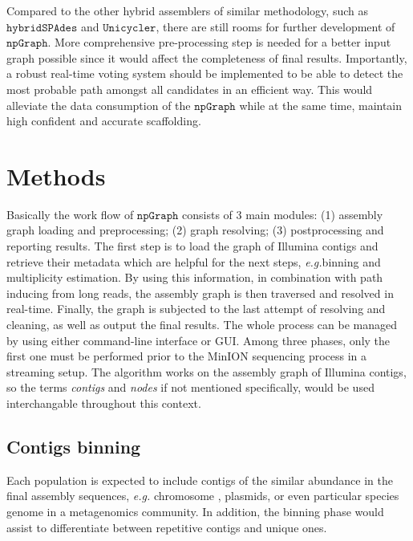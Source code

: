 \documentclass[10pt,twocolumn,twoside]{genpaper}
\newcommand{\npgraph}{$\mathtt{npGraph}$}
\newcommand{\unicycler}{$\mathtt{Unicycler}$}
\newcommand{\EG}{\emph{e.g.}}
\begin{document}
Compared to the other hybrid assemblers of similar methodology, such as $\mathtt{hybridSPAdes}$ and \unicycler{}, there are still rooms for further development of \npgraph{}. 
More comprehensive pre-processing step is needed for a better input graph possible since it would affect the completeness of final results. 
Importantly, a robust real-time voting system should be implemented to be able to detect the most probable path amongst all candidates in an efficient way.
This would alleviate the data consumption of the \npgraph{} while at the same time, maintain high confident and accurate scaffolding. 


\section*{Methods}

Basically the work flow of \npgraph{} consists of 3 main modules: (1) assembly graph loading and preprocessing; (2) graph resolving; (3) postprocessing and reporting results. 
The first step is to load the graph of Illumina contigs and retrieve their metadata which are helpful for the next steps, \EG binning and multiplicity estimation.
By using this information, in combination with path inducing from long reads, the assembly graph is then traversed and resolved in real-time.
Finally, the graph is subjected to the last attempt of resolving and cleaning, as well as output the final results. The whole process can be managed by using either command-line interface or GUI.
Among three phases, only the first one must be performed prior to the MinION sequencing process in a streaming setup.
The algorithm works on the assembly graph of Illumina contigs, so the terms \emph{contigs} and \emph{nodes} if not mentioned specifically, would be used interchangable throughout this context.
\subsection*{Contigs binning}
Each population is expected to include contigs of the similar abundance in the final assembly sequences, \EG{} chromosome , plasmids, or even particular species genome in a metagenomics community. In addition, the binning phase would assist to differentiate between repetitive contigs and unique ones. 
\end{document}
